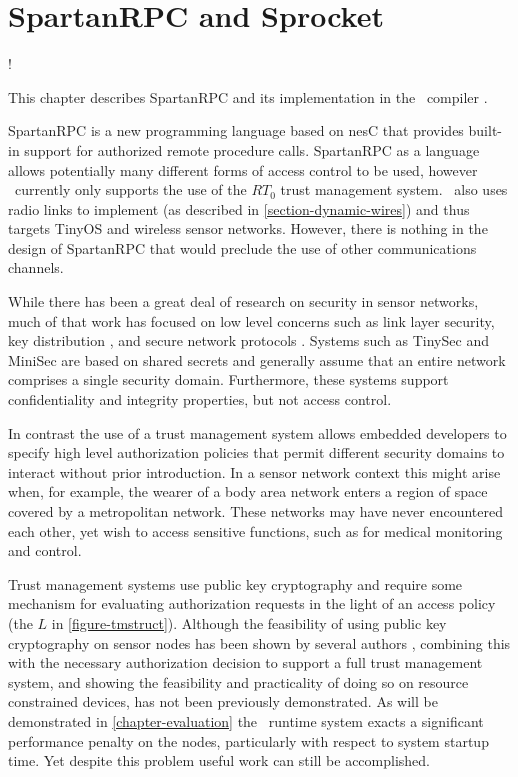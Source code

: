 
\chapter{SpartanRPC and Sprocket}
\label{chapter-spartanrpc-sprocket}

\lstset{language=nesC}
\lstMakeShortInline[basicstyle=\ttfamily]!

This chapter describes SpartanRPC \cite{chapin-skalka-SpartanRPC,chapin-skalka-SpartanRPCTR}
and its implementation in the \Sprocket\ compiler \cite{sprocket}.

SpartanRPC is a new programming language based on nesC that provides built-in support for
authorized remote procedure calls. SpartanRPC as a language allows potentially many different
forms of access control to be used, however \Sprocket\ currently only supports the use of the
$RT_0$ trust management system. \Sprocket\ also uses radio links to implement  (as described in \autoref{section-dynamic-wires}) and thus targets TinyOS and wireless
sensor networks. However, there is nothing in the design of SpartanRPC that would preclude the
use of other communications channels.

While there has been a great deal of research on security in sensor networks, much of that work
has focused on low level concerns such as link layer security, key distribution
\cite{camtepe-bulent-05}, and secure network protocols \cite{1049776,fouladgar-3tls-2006}.
Systems such as TinySec \cite{karlog-tinysec-2004} and MiniSec \cite{luk-minisec-2007} are based
on shared secrets and generally assume that an entire network comprises a single security
domain. Furthermore, these systems support confidentiality and integrity properties, but not
access control.

In contrast the use of a trust management system allows embedded developers to specify high
level authorization policies that permit different security domains to interact without prior
introduction. In a sensor network context this might arise when, for example, the wearer of a
body area network enters a region of space covered by a metropolitan network. These networks may
have never encountered each other, yet wish to access sensitive functions, such as for
medical monitoring and control.

Trust management systems use public key cryptography and require some mechanism for evaluating
authorization requests in the light of an access policy (the $L$ in \autoref{figure-tmstruct}).
Although the feasibility of using public key cryptography on sensor nodes has been shown by
several authors
\cite{1049776,Malan:2008:IPI:1387663.1387668,bertoni-2006,kumar-2006,4604657,Liu-Peng-TinyECC-2008,Szczechowiak:2008:NTL:1786014.1786040},
combining this with the necessary authorization decision to support a full trust management
system, and showing the feasibility and practicality of doing so on resource constrained
devices, has not been previously demonstrated. As will be demonstrated in
\autoref{chapter-evaluation} the \Sprocket\ runtime system exacts a significant performance
penalty on the nodes, particularly with respect to system startup time. Yet despite this problem
useful work can still be accomplished.

